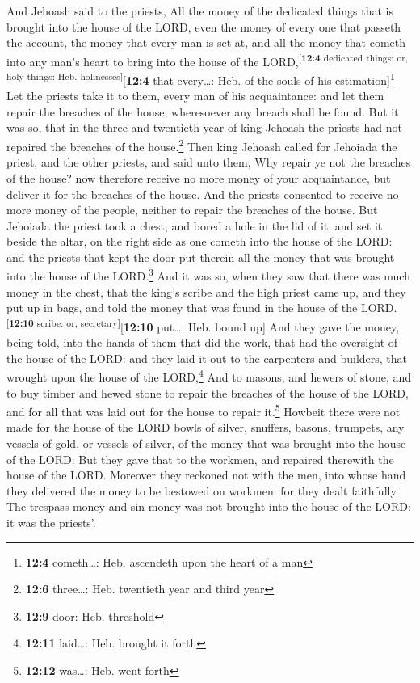  And Jehoash said to the priests, All the money of the
dedicated things that is brought into the house of the LORD, even the
money of every one that passeth the account, the money that every man is
set at, and all the money that cometh into any man's heart to bring into
the house of the LORD,\textsuperscript{{[}\textbf{12:4} dedicated
things: or, holy things: Heb. holinesses{]}}{[}\textbf{12:4} that
every\ldots: Heb. of the souls of his estimation{]}\footnote{\textbf{12:4}
  cometh\ldots: Heb. ascendeth upon the heart of a man} 
Let the priests take it to them, every man of his acquaintance: and let
them repair the breaches of the house, wheresoever any breach shall be
found.  But it was so, that in the three and twentieth
year of king Jehoash the priests had not repaired the breaches of the
house.\footnote{\textbf{12:6} three\ldots: Heb. twentieth year and third
  year}  Then king Jehoash called for Jehoiada the priest,
and the other priests, and said unto them, Why repair ye not the
breaches of the house? now therefore receive no more money of your
acquaintance, but deliver it for the breaches of the house.
 And the priests consented to receive no more money of the
people, neither to repair the breaches of the house.  But
Jehoiada the priest took a chest, and bored a hole in the lid of it, and
set it beside the altar, on the right side as one cometh into the house
of the LORD: and the priests that kept the door put therein all the
money that was brought into the house of the LORD.\footnote{\textbf{12:9}
  door: Heb. threshold}  And it was so, when they saw
that there was much money in the chest, that the king's scribe and the
high priest came up, and they put up in bags, and told the money that
was found in the house of the LORD.\textsuperscript{{[}\textbf{12:10}
scribe: or, secretary{]}}{[}\textbf{12:10} put\ldots: Heb. bound up{]}
 And they gave the money, being told, into the hands of
them that did the work, that had the oversight of the house of the LORD:
and they laid it out to the carpenters and builders, that wrought upon
the house of the LORD,\footnote{\textbf{12:11} laid\ldots: Heb. brought
  it forth}  And to masons, and hewers of stone, and to
buy timber and hewed stone to repair the breaches of the house of the
LORD, and for all that was laid out for the house to repair
it.\footnote{\textbf{12:12} was\ldots: Heb. went forth} 
Howbeit there were not made for the house of the LORD bowls of silver,
snuffers, basons, trumpets, any vessels of gold, or vessels of silver,
of the money that was brought into the house of the LORD:
 But they gave that to the workmen, and repaired
therewith the house of the LORD.  Moreover they reckoned
not with the men, into whose hand they delivered the money to be
bestowed on workmen: for they dealt faithfully.  The
trespass money and sin money was not brought into the house of the LORD:
it was the priests'.

